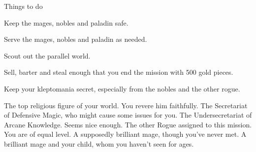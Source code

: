 \documentclass[char]{guildcamp3}
\begin{document}
\begin{itemz}[Goals]
  \item Things to do
  \item Keep the mages, nobles and paladin safe.
  \item Serve the mages, nobles and paladin as needed.
  \item Scout out the parallel world.
  \item Sell, barter and steal enough that you end the mission with 500 gold pieces.
  \item Keep your kleptomania secret, especially from the nobles and the other rogue.  
\end{itemz}




\begin{contacts}
	\contact{\cPaladin{}} The top religious figure of your world. You revere him faithfully.
	\contact{\cNobleOne{}} The Secretariat of Defensive Magic, who might cause some issues for you.
	\contact{\cNobleTwo{}} The Undersecretariat of Arcane Knowledge. Seems nice enough.
	\contact{\cRogueOne{}} The other Rogue assigned to this mission. You are of equal level.
	\contact{\cMageOne{}} A supposedly brilliant mage, though you've never met.
    \contact{\cMageTwo{}} A brilliant mage and your child, whom you haven't seen for ages.
\end{contacts}
\end{document}
